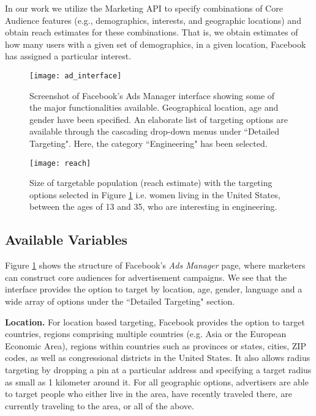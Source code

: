 In our work we utilize the Marketing API to specify combinations of Core Audience features (e.g., demographics, interests, and geographic locations) and obtain reach estimates for these combinations. That is, we obtain estimates of how many users with a given set of demographics, in a given location, Facebook has assigned a particular interest.

\begin{figure}
\centering
\texttt{[image: ad\_interface]}
\caption{Screenshot of Facebook's Ads Manager interface showing some of the major functionalities available. Geographical location, age and gender have been specified. An elaborate list of targeting options are available through the cascading drop-down menus under ``Detailed Targeting". Here, the category ``Engineering" has been selected.}
\label{fig:ad_interface}

\end{figure}

\begin{figure}

\centering
\texttt{[image: reach]}
\caption{Size of targetable population (reach estimate) with the targeting options selected in Figure \ref{fig:ad_interface} i.e. women living in the United States, between the ages of 13 and 35, who are interesting in engineering.}
\label{fig:reach}

\end{figure}

\subsection{Available Variables} \label{subsec:targeting_options}

Figure \ref{fig:ad_interface} shows the structure of Facebook's \textit{Ads Manager} page, where marketers can construct core audiences for advertisement campaigns. We see that the interface provides the option to target by location, age, gender, language and a wide array of options under the ``Detailed Targeting" section.

\textbf{Location.} For location based targeting, Facebook provides the option to target countries, regions comprising multiple countries (e.g. Asia or the European Economic Area), regions within countries such as provinces or states, cities, ZIP codes, as well as congressional districts in the United States. It also allows radius targeting by dropping a pin at a particular address and specifying a target radius as small as 1 kilometer around it. For all geographic options, advertisers are able to target people who either live in the area, have recently traveled there, are currently traveling to the area, or all of the above.


